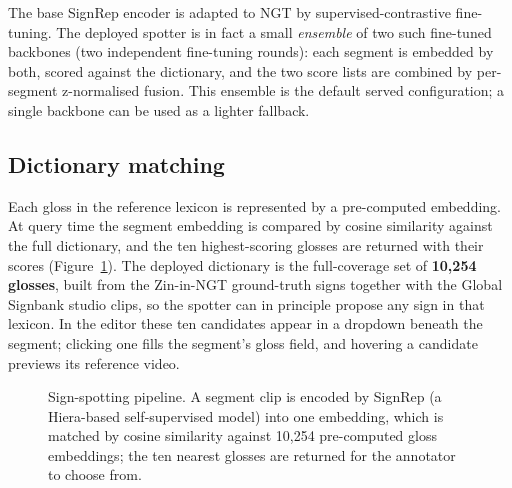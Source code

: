 \documentclass[11pt]{article}
\begin{document}
The base SignRep encoder is adapted to NGT by supervised-contrastive fine-tuning. The deployed
spotter is in fact a small \emph{ensemble} of two such fine-tuned backbones (two independent
fine-tuning rounds): each segment is embedded by both, scored against the dictionary, and the
two score lists are combined by per-segment z-normalised fusion. This ensemble is the default
served configuration; a single backbone can be used as a lighter fallback.

\subsection{Dictionary matching}
Each gloss in the reference lexicon is represented by a pre-computed embedding. At query time the
segment embedding is compared by cosine similarity against the full dictionary, and the ten
highest-scoring glosses are returned with their scores (Figure~\ref{fig:spot}). The deployed
dictionary is the full-coverage set of \textbf{10{,}254 glosses}, built from the Zin-in-NGT
ground-truth signs together with the Global Signbank studio clips, so the spotter can in
principle propose any sign in that lexicon. In the editor these ten candidates appear in a
dropdown beneath the segment; clicking one fills the segment's gloss field, and hovering a
candidate previews its reference video.

\begin{figure}[t]
\centering
{}
\caption{Sign-spotting pipeline. A segment clip is encoded by SignRep (a Hiera-based
self-supervised model) into one embedding, which is matched by cosine similarity against
10{,}254 pre-computed gloss embeddings; the ten nearest glosses are returned for the annotator
to choose from.}
\label{fig:spot}
\end{figure}
\end{document}
